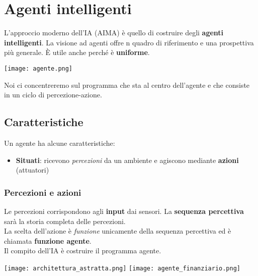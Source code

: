 \newpage
\section{Agenti intelligenti}
L'approccio moderno dell'IA (AIMA) è quello di costruire degli \textbf{agenti intelligenti}. La visione ad agenti offre n quadro di riferimento e una prospettiva più generale. È utile anche perché è \textbf{uniforme}.
\begin{center}
	\texttt{[image: agente.png]}
\end{center}
Noi ci concentreremo sul programma che sta al centro dell'agente e che consiste in un ciclo di percezione-azione.
\subsection{Caratteristiche}
Un agente ha alcune caratteristiche:
\begin{itemize}
	\item \textbf{Situati}: ricevono \emph{percezioni} da un ambiente e agiscono mediante \textbf{azioni} (attuatori)
	
\end{itemize}

\subsubsection{Percezioni e azioni}
Le percezioni corrispondono agli \textbf{input} dai sensori. La \textbf{sequenza percettiva} sarà la storia completa delle percezioni.\\
La scelta dell'azione è \emph{funzione} unicamente della sequenza percettiva ed è chiamata \textbf{funzione agente}.\\
Il compito dell'IA è costruire il programma agente.
\begin{center}
	\texttt{[image: architettura\_astratta.png]}
	\texttt{[image: agente\_finanziario.png]}
\end{center}

